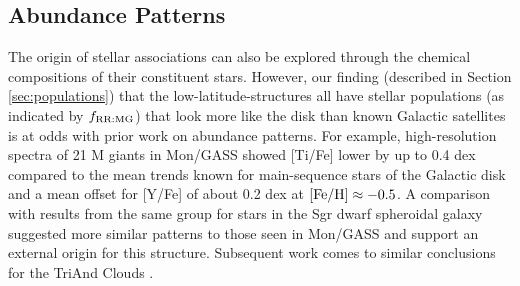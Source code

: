 \documentclass[galaxies,article,submit,moreauthors,pdftex,10pt,a4paper]{mdpi}
\newcommand{\frrmg}{\ensuremath{f_{\rm RR:MG}}}
\begin{document}

\subsection{Abundance Patterns}

\label{sec:abundances}

The origin of stellar associations can also be explored through the chemical compositions of their constituent stars.
However, our finding (described in Section \ref{sec:populations}) that the low-latitude-structures all have stellar populations (as indicated by \frrmg) that look more like the disk than known Galactic satellites is at odds with prior work on abundance patterns.
For example, high-resolution spectra of 21 M giants in Mon/GASS \cite{chou2010b} showed
[Ti/Fe] lower by up to 0.4 dex compared to the mean trends known for main-sequence stars of the Galactic disk \cite[e.g.,][]{reddy03,bensby2014} and a mean offset for [Y/Fe] of about 0.2 dex at ${\rm [Fe/H]} \approx -0.5$. A comparison with results from the same group for stars in the Sgr dwarf spheroidal galaxy \cite{chou2010a} suggested more similar patterns to those seen in Mon/GASS and support  an external origin for this structure. Subsequent work comes to similar conclusions for the TriAnd Clouds \cite{chou11}.

\end{document}
